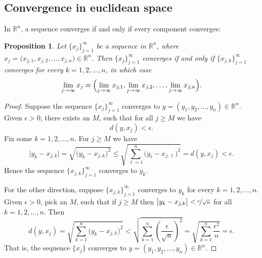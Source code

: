 \documentclass[12pt,openany]{book}
\newcommand{\R}{{\mathbb{R}}}
\theoremstyle{plain}
\newtheorem{prop}[thm]{Proposition}
\theoremstyle{remark}
\newtheorem{remark}[thm]{Remark}
\theoremstyle{definition}
\theoremstyle{exercise}
\theoremstyle{example}
\begin{document}

\subsection{Convergence in euclidean space}

In $\R^n$, a sequence converges if and only if every
component converges:

\begin{prop} \label{prop:msconveuc}
Let $\{ x_j \}_{j=1}^\infty$ be a sequence in $\R^n$,
where $x_j = \bigl(x_{j,1},x_{j,2},\ldots,x_{j,n}\bigr) \in \R^n$.
Then $\{ x_j \}_{j=1}^\infty$ converges if and only if
$\{ x_{j,k} \}_{j=1}^\infty$ converges for every $k=1,2,\ldots,n$, in which case
\begin{equation*}
\lim_{j\to\infty}
x_j =
\Bigl(
\lim_{j\to\infty} x_{j,1},
\lim_{j\to\infty} x_{j,2},
\ldots,
\lim_{j\to\infty} x_{j,n}
\Bigr) .
\end{equation*}
\end{prop}

\begin{proof}
Suppose
the sequence
$\{ x_j \}_{j=1}^\infty$ converges to
$y = (y_1,y_2,\ldots,y_n) \in \R^n$.
Given $\epsilon > 0$, there exists an $M$, such that for all
$j \geq M$ we have
\begin{equation*}
d(y,x_j) < \epsilon.
\end{equation*}
Fix some $k=1,2,\ldots,n$.  For $j \geq M$ we have
\begin{equation*}
\bigl\lvert y_k - x_{j,k} \bigr\rvert
=
\sqrt{{\bigl(y_k - x_{j,k} \bigr)}^2}
\leq
\sqrt{\sum_{\ell=1}^n {\bigl(y_\ell-x_{j,\ell}\bigr)}^2}
= d(y,x_j) < \epsilon .
\end{equation*}
Hence the sequence $\{ x_{j,k} \}_{j=1}^\infty$ converges to $y_k$.

For the other direction, suppose 
$\{ x_{j,k} \}_{j=1}^\infty$ converges to $y_k$ for every $k=1,2,\ldots,n$.
Given $\epsilon > 0$, pick an $M$, such that if $j \geq M$ then 
$\bigl\lvert y_k-x_{j,k} \bigr\rvert < \nicefrac{\epsilon}{\sqrt{n}}$ for all
$k=1,2,\ldots,n$.  Then
\begin{equation*}
d(y,x_j)
=
\sqrt{\sum_{k=1}^n {\bigl(y_k-x_{j,k}\bigr)}^2}
<
\sqrt{\sum_{k=1}^n {\left(\frac{\epsilon}{\sqrt{n}}\right)}^2}
=
\sqrt{\sum_{k=1}^n \frac{{\epsilon^2}}{n}}
= \epsilon .
\end{equation*}
That is, the sequence $\{ x_j \}$ converges to
$y = (y_1,y_2,\ldots,y_n) \in \R^n$.
\end{proof}
\end{document}
